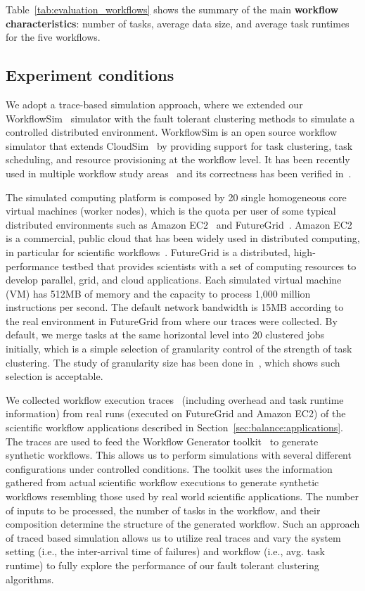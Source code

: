 Table~\ref{tab:evaluation_workflows} shows the summary of the main \textbf{workflow characteristics}: number of tasks, average data size, and average task runtimes for the five workflows. 


\subsection{Experiment conditions}
\label{sec:tolerance:experiment_conditions}
We adopt a trace-based simulation approach, where we extended our WorkflowSim~\cite{WorkflowSim} simulator with the fault tolerant clustering methods to simulate a controlled distributed environment. WorkflowSim is an open source workflow simulator that extends CloudSim~\cite{Calheiros2011} by providing support for task clustering, task scheduling, and resource provisioning at the workflow level. It has been recently used in multiple workflow study areas~\cite{WorkflowSim,Chen2012, jrad2013broker} and its correctness has been verified in~\cite{WorkflowSim}. 

The simulated computing platform is composed by 20 single homogeneous core virtual machines (worker nodes), which is the quota per user of some typical distributed environments such as Amazon EC2~\cite{AmazonAWS} and FutureGrid~\cite{FutureGrid}. Amazon EC2 is a commercial, public cloud that has been widely used in distributed computing, in particular for scientific workflows~\cite{Berriman2010}. FutureGrid is a distributed, high-performance testbed that provides scientists with a set of computing resources to develop parallel, grid, and cloud applications. Each simulated virtual machine (VM) has 512MB of memory and the capacity to process 1,000 million instructions per second. The default network bandwidth is 15MB according to the real environment in FutureGrid from where our traces were collected. By default, we merge tasks at the same horizontal level into 20 clustered jobs initially, which is a simple selection of granularity control of the strength of task clustering. The study of granularity size has been done in~\cite{Chen2013b}, which shows such selection is acceptable.

We collected workflow execution traces~\cite{Juve2013, Chen2011} (including overhead and task runtime information) from real runs (executed on FutureGrid and Amazon EC2) of the scientific workflow applications described in Section~\ref{sec:balance:applications}. The traces are used to feed the Workflow Generator toolkit~\cite{WorkflowGenerator} to generate synthetic workflows. This allows us to perform simulations with several different configurations under controlled conditions. The toolkit uses the information gathered from actual scientific workflow executions to generate synthetic workflows resembling those used by real world scientific applications. The number of inputs to be processed, the number of tasks in the workflow, and their composition determine the structure of the generated workflow. Such an approach of traced based simulation allows us to utilize real traces and vary the system setting (i.e., the inter-arrival time of failures) and workflow (i.e., avg. task runtime) to fully explore the performance of our fault tolerant clustering algorithms. 

